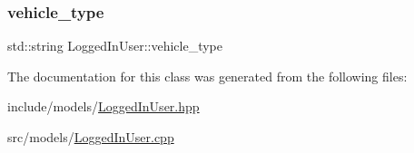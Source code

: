 \subsubsection{\texorpdfstring{vehicle\+\_\+type}{vehicle\_type}}
{\footnotesize\ttfamily std\+::string Logged\+In\+User\+::vehicle\+\_\+type\hspace{0.3cm}{\ttfamily [private]}}



The documentation for this class was generated from the following files\+:\begin{DoxyCompactItemize}
\item 
include/models/\mbox{\hyperlink{_logged_in_user_8hpp}{Logged\+In\+User.\+hpp}}\item 
src/models/\mbox{\hyperlink{_logged_in_user_8cpp}{Logged\+In\+User.\+cpp}}\end{DoxyCompactItemize}
